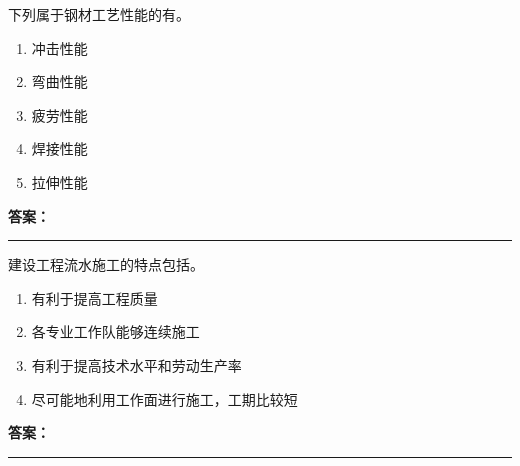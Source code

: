 \documentclass[UTF8,fontset=fandol,11pt]{ctexart}
\newcommand{\answerline}{\textcolor{answerred}{\rule{2.4cm}{0.7pt}}}
\begin{document}
\begin{quizbox}[title={乱序第 52 题｜第四章混凝土结构工程}]

下列属于钢材工艺性能的有。\\

\begin{enumerate}[label=\Alph*.]

\item 冲击性能

\item 弯曲性能

\item 疲劳性能

\item 焊接性能

\item 拉伸性能

\end{enumerate}

\textbf{\textcolor{answerred}{答案：}} \answerline

\end{quizbox}

\vspace{0.2em}

\begin{quizbox}[title={乱序第 53 题｜第十章流水施工原理}]

建设工程流水施工的特点包括。\\

\begin{enumerate}[label=\Alph*.]

\item 有利于提高工程质量

\item 各专业工作队能够连续施工

\item 有利于提高技术水平和劳动生产率

\item 尽可能地利用工作面进行施工，工期比较短

\end{enumerate}

\textbf{\textcolor{answerred}{答案：}} \answerline

\end{quizbox}

\vspace{0.2em}
\end{document}
